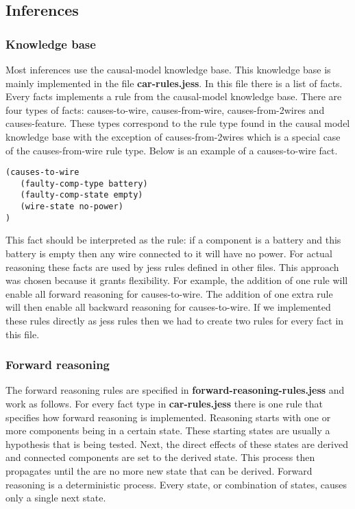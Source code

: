 \subsection{Inferences}
\label{sec:inferences}
\subsubsection{Knowledge base}
Most inferences use the causal-model knowledge base. This knowledge base is mainly implemented in the file \textbf{car-rules.jess}. In this file there is a list of facts. Every facts implements a rule from the causal-model knowledge base. There are four types of facts: causes-to-wire, causes-from-wire, causes-from-2wires and causes-feature. These types correspond to the rule type found in the causal model knowledge base with the exception of causes-from-2wires which is a special case of the causes-from-wire rule type. Below is an example of a causes-to-wire fact.

\begin{verbatim}
(causes-to-wire
   (faulty-comp-type battery)
   (faulty-comp-state empty)
   (wire-state no-power)
)
\end{verbatim}

This fact should be interpreted as the rule: if a component is a battery and this battery is empty then any wire connected to it will have no power. For actual reasoning these facts are used by jess rules defined in other files. This approach was chosen because it grants flexibility. For example, the addition of one rule will enable all forward reasoning for causes-to-wire. The addition of one extra rule will then enable all backward reasoning for causes-to-wire. If we implemented these rules directly as jess rules then we had to create two rules for every fact in this file.

\subsubsection{Forward reasoning}
The forward reasoning rules are specified in \textbf{forward-reasoning-rules.jess} and work as follows. For every fact type in \textbf{car-rules.jess} there is one rule that specifies how forward reasoning is implemented. Reasoning starts with one or more components being in a certain state. These starting states are usually a hypothesis that is being tested. Next, the direct effects of these states are derived and connected components are set to the derived state. This process then propagates until the are no more new state that can be derived.	Forward reasoning is a deterministic process. Every state, or combination of states, causes only a single next state. 

